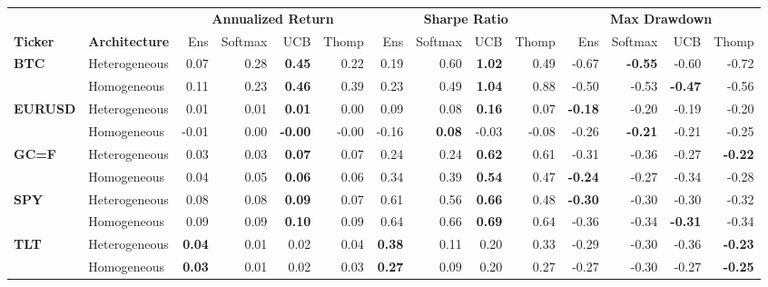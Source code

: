 \documentclass[pdflatex,sn-mathphys-num]{sn-jnl}
\theoremstyle{thmstyleone}%
\theoremstyle{thmstyletwo}%
\theoremstyle{thmstylethree}%
\begin{document}
\begin{table}
    \begin{tabular}{@{} ll rrrr rrrr rrrr @{}}
    \toprule
     & & \multicolumn{4}{c}{\textbf{Annualized Return}} & \multicolumn{4}{c}{\textbf{Sharpe Ratio}} & \multicolumn{4}{c}{\textbf{Max Drawdown}} \\
     \cmidrule(lr){3-6} \cmidrule(lr){7-10} \cmidrule(lr){11-14}
    \textbf{Ticker} & \textbf{Architecture} & Ens & Softmax & UCB & Thomp & Ens & Softmax & UCB & Thomp & Ens & Softmax & UCB & Thomp \\
    \midrule
    \multirow{2}{*}{\textbf{BTC}} & Heterogeneous & 0.07 & 0.28 & \textbf{0.45} & 0.22 & 0.19 & 0.60 & \textbf{1.02} & 0.49 & -0.67 & \textbf{-0.55} & -0.60 & -0.72 \\
     & Homogeneous & 0.11 & 0.23 & \textbf{0.46} & 0.39 & 0.23 & 0.49 & \textbf{1.04} & 0.88 & -0.50 & -0.53 & \textbf{-0.47} & -0.56 \\
    \midrule
    \multirow{2}{*}{\textbf{EURUSD}} & Heterogeneous & 0.01 & 0.01 & \textbf{0.01} & 0.00 & 0.09 & 0.08 & \textbf{0.16} & 0.07 & \textbf{-0.18} & -0.20 & -0.19 & -0.20 \\
     & Homogeneous & -0.01 & 0.00 & \textbf{-0.00} & -0.00 & -0.16 & \textbf{0.08} & -0.03 & -0.08 & -0.26 & \textbf{-0.21} & -0.21 & -0.25 \\
    \midrule
    \multirow{2}{*}{\textbf{GC=F}} & Heterogeneous & 0.03 & 0.03 & \textbf{0.07} & 0.07 & 0.24 & 0.24 & \textbf{0.62} & 0.61 & -0.31 & -0.36 & -0.27 & \textbf{-0.22} \\
     & Homogeneous & 0.04 & 0.05 & \textbf{0.06} & 0.06 & 0.34 & 0.39 & \textbf{0.54} & 0.47 & \textbf{-0.24} & -0.27 & -0.34 & -0.28 \\
    \midrule
    \multirow{2}{*}{\textbf{SPY}} & Heterogeneous & 0.08 & 0.08 & \textbf{0.09} & 0.07 & 0.61 & 0.56 & \textbf{0.66} & 0.48 & \textbf{-0.30} & -0.30 & -0.30 & -0.32 \\
     & Homogeneous & 0.09 & 0.09 & \textbf{0.10} & 0.09 & 0.64 & 0.66 & \textbf{0.69} & 0.64 & -0.36 & -0.34 & \textbf{-0.31} & -0.34 \\
    \midrule
    \multirow{2}{*}{\textbf{TLT}} & Heterogeneous & \textbf{0.04} & 0.01 & 0.02 & 0.04 & \textbf{0.38} & 0.11 & 0.20 & 0.33 & -0.29 & -0.30 & -0.36 & \textbf{-0.23} \\
     & Homogeneous & \textbf{0.03} & 0.01 & 0.02 & 0.03 & \textbf{0.27} & 0.09 & 0.20 & 0.27 & -0.27 & -0.30 & -0.27 & \textbf{-0.25} \\
    \bottomrule
    \end{tabular}
\end{table}
\end{document}
